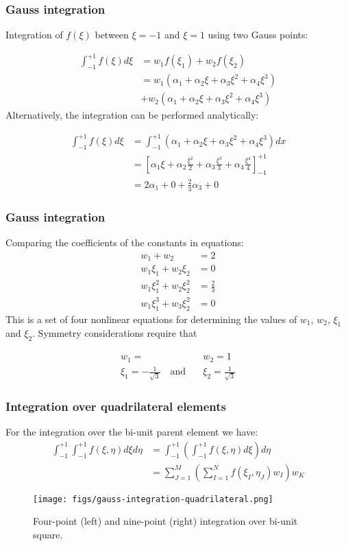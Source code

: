 \documentclass[notes]{beamer}
\begin{document}
\begin{frame}
\frametitle{Gauss integration}
Integration of $f(\xi)$ between $\xi = -1$ and $\xi = 1$ using two Gauss points:

\begin{align*}
	\int_{-1}^{+1}f(\xi) d\xi & = w_1 f(\xi_1) + w_2 f(\xi_2) \\
	& = w_1(\alpha_1 + \alpha_2 \xi + \alpha_3 \xi^2 + \alpha_4 \xi^3) \\
	& + w_2(\alpha_1 + \alpha_2 \xi + \alpha_3 \xi^2 + \alpha_4 \xi^3)
\end{align*}
Alternatively, the integration can be performed analytically:

\begin{align*}
	\int_{-1}^{+1}f(\xi) d\xi & = \int_{-1}^{+1}(\alpha_1 + \alpha_2 \xi + \alpha_3 \xi^2 + \alpha_4 \xi^3) dx \\
	& = \left[ \alpha_1 \xi + \alpha_2 \frac{\xi^2}{2} + \alpha_3 \frac{\xi^3}{3} + \alpha_4 \frac{\xi^4}{4} \right]_{-1}^{+1} \\
	& = 2 \alpha_1 + 0 + \frac{2}{3} \alpha_3 + 0
\end{align*}
\end{frame}

\begin{frame}
\frametitle{Gauss integration}
Comparing the coefficients of the constants in equations:
\begin{align*}
		w_1 + w_2 & = 2 \\
		w_1 \xi_1 + w_2 \xi_2 & = 0 \\
		w_1 \xi_1^2 + w_2 \xi_2^2 & = \frac{2}{3} \\
		w_1 \xi_1^3 + w_3 \xi_2^2 & = 0
\end{align*}
This is a set of four nonlinear equations for determining the values of $w_1$, $w_2$, $\xi_1$ and $\xi_2$. Symmetry considerations require that

\begin{align*}
	w_1 = & w_2 = 1 \\
	\xi_1 = -\frac{1}{\sqrt{3}} \quad	\mathrm{and}\quad & \xi_2 = \frac{1}{\sqrt{3}}
\end{align*}
\end{frame}


\begin{frame}
\frametitle{Integration over quadrilateral elements}
For the integration over the bi-unit parent
element we have:
\begin{align*}
	\int_{-1}^{+1}	\int_{-1}^{+1} f(\xi, \eta) d\xi d\eta & = 	\int_{-1}^{+1}\left(		\int_{-1}^{+1}f(\xi, \eta) d\xi \right) d\eta\\
	& = \sum_{J=1}^M \left(\sum_{I=1}^N f(\xi_I, \eta_J) w_I\right) w_K
\end{align*}
\begin{figure}[ht]
	\centering
	\texttt{[image: figs/gauss-integration-quadrilateral.png]}
	\caption*{Four-point (left) and nine-point (right) integration over bi-unit square.}
\end{figure}
\end{frame}
\end{document}
